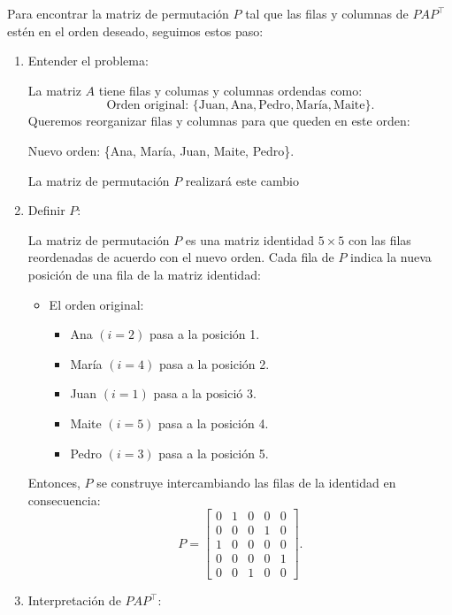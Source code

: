\begin{enumerate}[label=\color{red}\textbf{\arabic*)}]
        Para encontrar la matriz de permutación $P$ tal que las filas y columnas de  $PAP^\intercal$ estén en el orden deseado, seguimos estos paso:
        \begin{enumerate}[label=\arabic*)]
            \item Entender el problema:

                La matriz $A$ tiene filas y columas y columnas ordendas como: \[
                \text{Orden original: }\{\mathrm{Juan},\mathrm{Ana},\mathrm{Pedro}, \text{María},\text{Maite}\} .
                \] 
                Queremos reorganizar filas y columnas para que queden en este orden:
                \begin{center}
                    Nuevo orden: \{Ana, María, Juan, Maite, Pedro\}.
                \end{center}
                La matriz de permutación $P$ realizará este cambio
            \item Definir $P$:

                La matriz de permutación $P$ es una matriz identidad $5\times 5$ con las filas reordenadas de acuerdo con el nuevo orden. Cada fila de $P$ indica la nueva posición de una fila de la matriz identidad:
                \begin{itemize}[label=\textbullet]
                    \item El orden original:
                        \begin{itemize}[label=\textbullet]
                            \item Ana $(i=2)$ pasa a la posición 1.
                            \item María $(i=4)$ pasa a la posición 2.
                            \item Juan $(i=1)$ pasa a la posició 3.
                            \item Maite $(i=5)$ pasa a la posición 4.
                            \item Pedro $(i=3)$ pasa a la posición 5.
                        \end{itemize}
                \end{itemize}
                Entonces, $P$ se construye intercambiando las filas de la identidad en consecuencia: \[
                P=\begin{bmatrix} 
                    0 & 1 & 0 & 0 & 0\\
                    0 & 0 & 0 & 1 & 0\\
                    1 & 0 & 0 & 0 & 0\\
                    0 & 0 & 0 & 0 & 1\\
                    0 & 0 & 1 & 0 & 0
                \end{bmatrix} .
                \] 
            \item Interpretación de $PAP^\intercal$:


\end{enumerate}
\end{enumerate}
